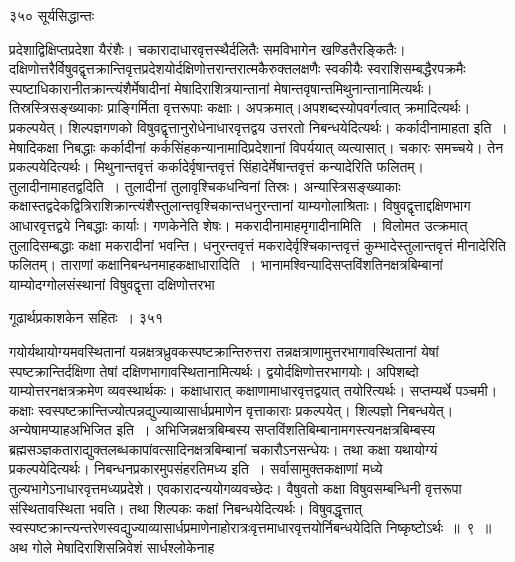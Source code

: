 \documentclass[11pt, openany]{book}
\begin{document}
\newpage


\noindent ३५० \hspace{4cm} सूर्यसिद्धान्तः
\vspace{1cm}


\noindent प्रदेशाद्विक्षिप्तप्रदेशा यैरंशैः। चकारादाधारवृत्तस्थैर्दलितैः समविभागेन खण्डितैरङ्कितैः। दक्षिणोत्तरैर्विषुवद्वृत्तक्रान्तिवृत्तप्रदेशयोर्दक्षिणोत्तरान्तरात्मकैरुक्तलक्षणैः स्वकीयैः स्वराशिसम्बद्धैरपक्रमैः स्पष्टाधिकारानीतक्रान्त्यंशैर्मेषादीनां मेषादिराशित्रयान्तानां मेषान्तवृषान्तमिथुनान्तानामित्यर्थः। तिस्रस्त्रिसङ्ख्याकाः प्राङ्गिर्मिता वृत्तरूपाः कक्षाः। अपक्रमात्।अपशब्दस्योपवर्गत्वात् क्रमादित्यर्थः। प्रकल्पयेत्। शिल्पज्ञगणको विषुवद्वृत्तानुरोधेनाधारवृत्तद्वय उत्तरतो निबन्धयेदित्यर्थः। कर्कादीनामाह\textendash ता इति~। मेषादिकक्षा निबद्धाः कर्कादीनां कर्कसिंहकन्यानामादिप्रदेशानां विपर्ययात् व्यत्यासात्। चकारः समच्चये। तेन प्रकल्पयेदित्यर्थः। मिथुनान्तवृत्तं कर्कादेर्वृषान्तवृत्तं सिंहादेर्मेषान्तवृत्तं कन्यादेरिति फलितम्। तुलादीनामाह\textendash तद्वदिति~। तुलादीनां तुलावृश्चिकधन्विनां तिस्रः। अन्यास्त्रिसङ्ख्याकाः कक्षास्तद्वदेकद्वित्रिराशिक्रान्त्यंशैस्तुलान्तवृश्चिकान्तधनुरन्तानां याम्यगोलाश्रिताः। विषुवद्वृत्ताद्दक्षिणभाग आधारवृत्तद्वये निबद्धाः कार्याः। गणकेनेति शेषः। मकरादीनामाह\textendash मृगादीनामिति~। विलोमत उत्क्रमात् तुलादिसम्बद्धाः कक्षा मकरादीनां भवन्ति। धनुरन्तवृत्तं मकरादेर्वृश्चिकान्तवृत्तं कुम्भादेस्तुलान्तवृत्तं मीनादेरिति फलितम्। ताराणां कक्षानिबन्धनमाह\textendash कक्षाधारादिति~। भानामश्विन्यादिसप्तविंशतिनक्षत्रबिम्बानां याम्योदग्गोलसंस्थानां विषुवद्वृत्ता दक्षिणोत्तरभा \textendash



\newpage


\hspace{3cm} गूढार्थप्रकाशकेन सहितः~। \hfill ३५१
\vspace{1cm}


\noindent गयोर्यथायोग्यमवस्थितानां यन्नक्षत्रध्रुवकस्पष्टक्रान्तिरुत्तरा तन्नक्षत्राणामुत्तरभागावस्थितानां येषां स्पष्टक्रान्तिर्दक्षिणा तेषां दक्षिणभागावस्थितानामित्यर्थः। द्वयोर्दक्षिणोत्तरभागयोः। अपिशब्दो याम्योत्तरनक्षत्रक्रमेण व्यवस्थार्थकः। कक्षाधारात् कक्षाणामाधारवृत्तद्वयात् तयोरित्यर्थः। सप्तम्यर्थे पञ्चमी। कक्षाः स्वस्पष्टक्रान्तिज्योत्पन्नद्युज्याव्यासार्धप्रमाणेन वृत्ताकाराः प्रकल्पयेत्। शिल्पज्ञो निबन्धयेत्। अन्येषामप्याह\textendash अभिजित इति~। अभिजिन्नक्षत्रबिम्बस्य सप्तविंशतिबिम्बानामगस्त्यनक्षत्रबिम्बस्य ब्रह्मसञ्ज्ञकताराद्युक्तलब्धकापांवत्सादिनक्षत्रबिम्बानां चकारौऽनसन्धेयः। तथा कक्षा यथायोग्यं प्रकल्पयेदित्यर्थः। निबन्धनप्रकारमुपसंहरति\textendash मध्य इति~। सर्वासामुक्तकक्षाणां मध्ये तुल्यभागेऽनाधारवृत्तमध्यप्रदेशे। एवकारादन्ययोगव्यवच्छेदः। वैषुवतो कक्षा विषुवसम्बन्धिनी वृत्तरूपा संस्थितावस्थिता भवति। तथा शिल्पकः कक्षां निबन्धयेदित्यर्थः। विषुवद्धृत्तात् स्वस्पष्टक्रान्त्यन्तरेणस्वद्युज्याव्यासार्धप्रमाणेनाहोरात्रःवृत्तमाधारवृत्तयोर्निबन्धयेदिति निष्कृष्टोऽर्थः~॥~९~॥\\ 
\noindent अथ गोले मेषादिराशिसन्निवेशं सार्धश्लोकेनाह \textendash
\end{document}

